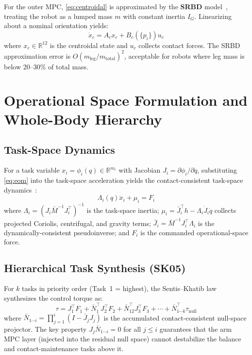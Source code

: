 \documentclass[journal]{IEEEtran}
\newcommand{\Mbar}{\bar{M}^{-1}}
\begin{document}
For the outer MPC, \eqref{eq:centroidal} is approximated by the
\textbf{SRBD} model~\cite{dicarlo2018dynamic}, treating the robot as a
lumped mass $m$ with constant inertia $I_G$. Linearizing about a nominal
orientation yields:
\begin{equation}\label{eq:SRBD}
  \dot{x}_c = A_c x_c + B_c(\{p_i\})u_c
\end{equation}
where $x_c\in\mathbb{R}^{12}$ is the centroidal state and $u_c$ collects
contact forces. The SRBD approximation error is
$O(m_{\text{leg}}/m_{\text{total}})^2$, acceptable for robots where leg
mass is below 20--30\% of total mass.

\section{Operational Space Formulation and Whole-Body Hierarchy}
\label{sec:osf}

\subsection{Task-Space Dynamics}

For a task variable $x_i=\phi_i(q)\in\mathbb{R}^{m_i}$ with Jacobian
$J_i=\partial\phi_i/\partial q$, substituting \eqref{eq:eom} into the
task-space acceleration yields the contact-consistent task-space
dynamics~\cite{khatib1987unified,righetti2011inverse}:
\begin{equation}\label{eq:taskdyn}
  \Lambda_i(q)\ddot{x}_i + \mu_i = F_i
\end{equation}
where $\Lambda_i=(J_i\Mbar J_i^\top)^{-1}$ is the task-space inertia;
$\mu_i=\bar{J}_i^\top h - \Lambda_i\dot{J}_i\dot{q}$ collects projected
Coriolis, centrifugal, and gravity terms; $\bar{J}_i=\Mbar J_i^\top\Lambda_i$
is the dynamically-consistent pseudoinverse; and $F_i$ is the commanded
operational-space force.

\subsection{Hierarchical Task Synthesis (SK05)}

For $k$ tasks in priority order (Task~1 = highest), the Sentis--Khatib
law~\cite{sentis2005synthesis} synthesizes the control torque as:
\begin{equation}\label{eq:SK05}
  \tau = J_1^\top F_1 + \bar{N}_1^\top J_2^\top F_2
       + \bar{N}_{12}^\top J_3^\top F_3 + \cdots
       + \bar{N}_{1\cdots k}^\top\tau_{\text{null}}
\end{equation}
where $\bar{N}_{1\cdots i}=\prod_{j=1}^{i}(I-\bar{J}_jJ_j)$ is the
accumulated contact-consistent null-space projector.
The key property $J_j\bar{N}_{1\cdots i}=0$ for all $j\leq i$ guarantees
that the arm MPC layer (injected into the residual null space) cannot
destabilize the balance and contact-maintenance tasks above it.
\end{document}
